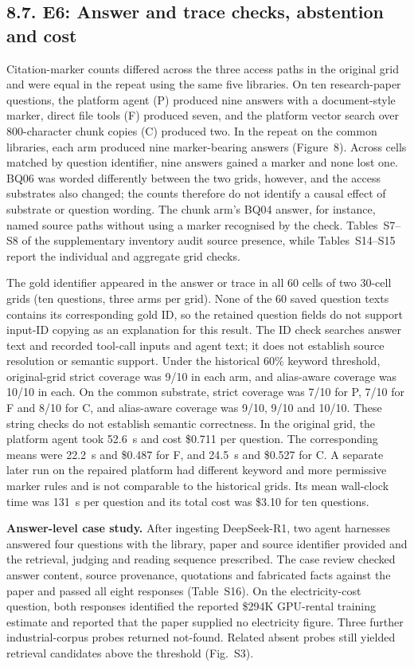 \subsection{8.7. E6: Answer and trace checks, abstention and cost}


Citation-marker counts differed across the three access paths in the original
grid and were equal in the repeat using the same five libraries. On ten research-paper
questions, the platform agent (P) produced nine answers with a
document-style marker, direct file tools (F) produced seven, and the
platform vector search over 800-character chunk copies (C) produced two.
In the repeat on the common libraries, each arm produced nine marker-bearing
answers (Figure~8). Across cells matched by question identifier,
nine answers gained a marker and none lost one. BQ06 was worded differently
between the two grids, however, and the access substrates also changed; the
counts therefore do not identify a causal effect of substrate or question
wording. The chunk arm's BQ04 answer, for
instance, named source paths without using a marker recognised by the
check. Tables~S7--S8 of the supplementary inventory audit source presence,
while Tables~S14--S15 report the individual and aggregate grid checks.

The gold identifier appeared in the answer or trace in all 60 cells of two
30-cell grids (ten questions, three arms per grid).
None of the 60 saved question texts contains its corresponding gold ID, so
the retained question fields do not support input-ID copying as an explanation
for this result. The ID check searches answer text and recorded tool-call
inputs and agent text; it does not establish source resolution or semantic
support. Under the historical 60\% keyword threshold, original-grid strict
coverage was 9/10 in each arm, and alias-aware coverage was 10/10 in each.
On the common substrate, strict coverage was 7/10 for P, 7/10 for F and
8/10 for C, and alias-aware coverage
was 9/10, 9/10 and 10/10. These string checks do not establish semantic
correctness. In the original grid, the platform agent took 52.6~s and cost
\$0.711 per question. The corresponding means were 22.2~s and \$0.487 for
F, and 24.5~s and \$0.527 for C. A separate later run on the repaired
platform had different keyword and more permissive marker rules and is not
comparable to the historical grids. Its mean wall-clock time was 131~s per
question and its total cost was \$3.10 for ten questions.

\textbf{Answer-level case study.} After ingesting DeepSeek-R1, two agent
harnesses answered four questions with the library, paper and source identifier
provided and the retrieval, judging and reading sequence prescribed.
The case review checked answer content, source provenance, quotations
and fabricated facts against the paper and passed all eight responses
(Table~S16). On the electricity-cost question, both responses identified
the reported \$294K GPU-rental training estimate and reported that the
paper supplied no electricity figure. Three further industrial-corpus
probes returned not-found. Related absent probes still yielded retrieval
candidates above the threshold (Fig.~S3).

